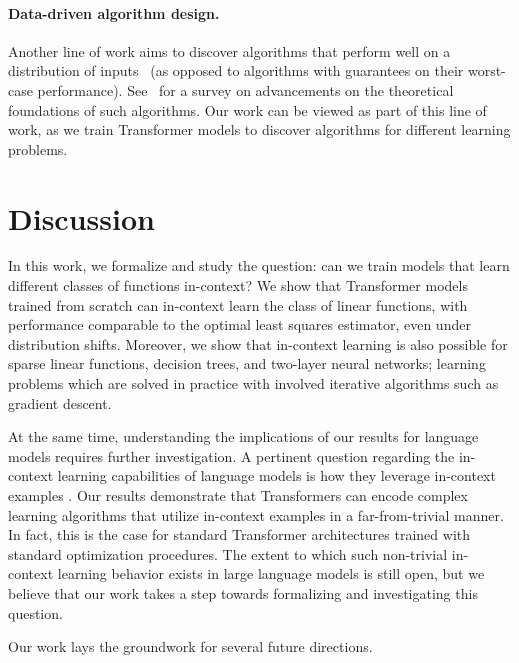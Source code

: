 \documentclass{article}
\begin{document}
\paragraph{Data-driven algorithm design.}
Another line of work aims to discover algorithms that perform well on a distribution of inputs~\citep{horvitz2001bayesian,xu2008satzilla,vinyals2015pointer,bello2016neural,khalil2017learning,selsam2018learning,schwarzschild2021can} (as opposed to algorithms with guarantees on their worst-case performance).
See~\citet{balcan2020data} for a survey on advancements on the theoretical foundations of such algorithms.
Our work can be viewed as part of this line of work, as we train Transformer models to discover algorithms for different learning problems.

\section{Discussion}
\label{sec:discussion}

In this work, we formalize and study the question: can we train models that learn different classes of functions in-context? We show that Transformer models trained from scratch can in-context learn the class of linear functions, with performance comparable to the optimal least squares estimator, even under distribution shifts. Moreover, we  show that in-context learning is also possible for sparse linear functions, decision trees, and two-layer neural networks; learning problems which are solved in practice with involved iterative algorithms such as gradient descent. 

At the same time, understanding the implications of our results for language models requires further investigation. A pertinent question regarding the in-context learning capabilities of language models is how they leverage in-context examples \citep{min2022rethinking}. Our results demonstrate that Transformers can encode complex learning algorithms that utilize in-context examples in a far-from-trivial manner. In fact, this is the case for standard Transformer architectures trained with standard optimization procedures. The extent to which such non-trivial in-context learning behavior exists in large language models is still open, but we believe that our work takes a step towards formalizing and investigating this question.

Our work lays the groundwork for several future directions.
\end{document}
